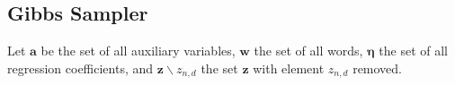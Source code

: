 %
%

\subsection{Gibbs Sampler}
 Let $\mathbf{a}$ be the set of all auxiliary variables, $\mathbf{w}$  the set of all words, $\boldsymbol\eta$  the set of all regression coefficients, and  $\mathbf{z}\backslash z_{n,d}$  the set $\mathbf{z}$ with element $z_{n,d}$ removed.  %




